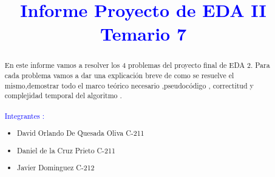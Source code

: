 \documentclass{article}
\begin{document}
    \title{\textcolor{blue}{\textbf{Informe Proyecto de EDA II \\Temario 7}}\\}
    
    \date{} 
    \maketitle  

    \begin{abstract}
        \noindent En este informe  vamos a resolver los 4 problemas del proyecto final de EDA 2.
        Para cada problema vamos a dar  una explicaci\'on breve de como se resuelve el mismo,demostrar todo el marco te\'orico necesario 
        ,pseudoc\'odigo , correctitud y complejidad temporal del algoritmo . \\\\
        {\large{ \textcolor{blue}{Integrantes :}}}
        \begin{itemize}
            \item David Orlando De Quesada Oliva  C-211
            \item Daniel de la Cruz Prieto C-211
            \item Javier Dominguez C-212
        \end{itemize}
       
    \end{abstract}

    \newpage 

    \tableofcontents

    \newpage 
\end{document}
